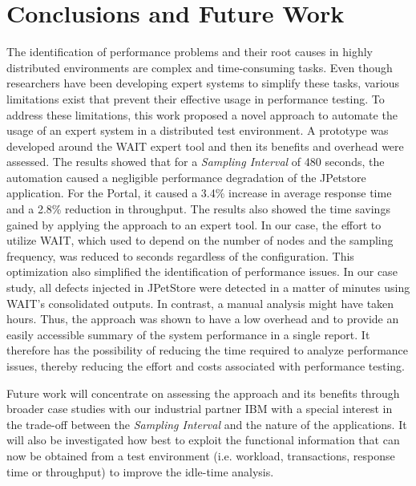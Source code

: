 \documentclass[runningheads,a4paper]{llncs}
\begin{document}
\section{Conclusions and Future Work}
\label{Conclusions}
\vspace{-7pt}

The identification of performance problems and their root causes in highly
distributed environments are complex and time-consuming tasks. Even though
researchers have been developing expert systems to simplify these tasks, various
limitations exist that prevent their effective usage in performance testing. To
address these limitations, this work proposed a novel approach to automate the usage of 
an expert system in a distributed test environment. A prototype was developed
around the WAIT expert tool and then its benefits and overhead were assessed.
The results showed that for a \emph{Sampling Interval} of 480 seconds, the automation
caused a negligible performance degradation of the JPetstore application. For the Portal,
it caused a 3.4\% increase in average response time and a 2.8\% reduction in
throughput. The results also showed the time savings gained by applying the
approach to an expert tool. In our case, the effort to utilize WAIT, which used
to depend on the number of nodes and the sampling frequency, was
reduced to seconds regardless of the configuration. This optimization also
simplified the identification of performance issues. In our case study, all
defects injected in JPetStore were detected in a matter of minutes using WAIT's
consolidated outputs. In contrast, a manual analysis might have taken hours.
Thus, the approach was shown to have a low overhead and to provide an easily
accessible summary of the system performance in a single report. It therefore
has the possibility of reducing the time required to analyze performance issues,
thereby reducing the effort and costs associated with performance testing.

Future work will concentrate on assessing the approach and its benefits through
broader case studies with our industrial partner IBM with a special interest in 
the trade-off between the \emph{Sampling Interval} and the nature of the
applications.  It will also be investigated how best to exploit the
functional information that can now be obtained from a test environment (i.e.
workload, transactions, response time or throughput) to improve the idle-time
analysis.


\vspace{-8pt}
\end{document}
